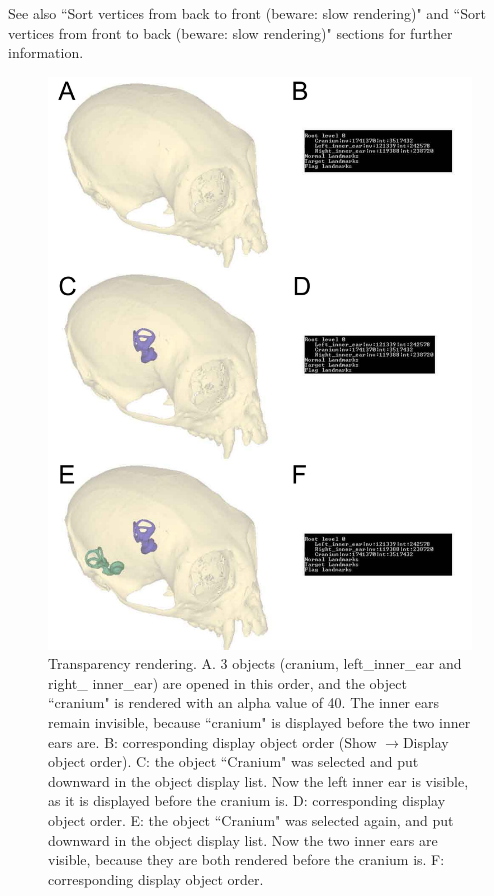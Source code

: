 See also ``Sort vertices from back to front (beware: slow rendering)" and ``Sort vertices from front to back (beware: slow rendering)" sections for further information.\\

\begin{figure}
  \centering
  \includegraphics[scale=0.4]{images/Transparency/Transparency.pdf} 
	\caption{Transparency rendering. A. 3 objects (cranium, left\_inner\_ear and right\_
inner\_ear) are opened in this order, and the object ``cranium" is rendered with an alpha value of 40.
The inner ears remain invisible, because ``cranium" is displayed before the two inner ears are. B: corresponding display object order (Show $\rightarrow$Display
object order). C: the object ``Cranium" was selected and put downward in the object display list. Now the left inner ear is visible, as it is displayed before the cranium is. D: corresponding display object order. E: the object ``Cranium" was selected again, and put downward in the object display list. Now the two inner ears are
visible, because they are both rendered before the cranium is. F: corresponding display object order.}
\label{transparency}
 
\end{figure}





